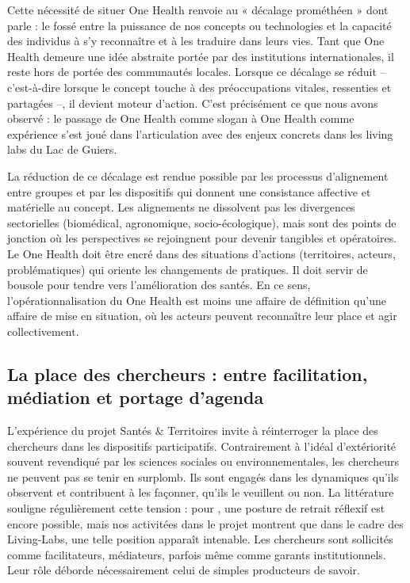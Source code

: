 \documentclass{article}
\begin{document}
Cette nécessité de situer One Health renvoie au « décalage prométhéen » dont parle \textcite{anders_obsolescence_1956} : le fossé entre la puissance de nos concepts ou technologies et la capacité des individus à s’y reconnaître et à les traduire dans leurs vies. Tant que One Health demeure une idée abstraite portée par des institutions internationales, il reste hors de portée des communautés locales. Lorsque ce décalage se réduit -- c’est-à-dire lorsque le concept touche à des préoccupations vitales, ressenties et partagées --, il devient moteur d’action. C’est précisément ce que nous avons observé : le passage de One Health comme slogan à One Health comme expérience s’est joué dans l’articulation avec des enjeux concrets dans les living labs du Lac de Guiers.

La réduction de ce décalage est rendue possible par les processus d’alignement entre groupes et par les dispositifs qui donnent une consistance affective et matérielle au concept. Les alignements ne dissolvent pas les divergences sectorielles (biomédical, agronomique, socio-écologique), mais sont des points de jonction où les perspectives se rejoingnent pour devenir tangibles et opératoires. Le One Health doit être encré dans des situations d'actions (territoires, acteurs, problématiques) qui oriente les changements de pratiques. Il doit servir de bousole pour tendre vers l'amélioration des santés. En ce sens, l’opérationnalisation du One Health est moins une affaire de définition qu’une affaire de mise en situation, où les acteurs peuvent reconnaître leur place et agir collectivement.

\subsection{La place des chercheurs : entre facilitation, médiation et portage d’agenda}

L’expérience du projet Santés \& Territoires invite à réinterroger la place des chercheurs dans les dispositifs participatifs. Contrairement à l’idéal d’extériorité souvent revendiqué par les sciences sociales ou environnementales, les chercheurs ne peuvent pas se tenir en surplomb. Ils sont engagés dans les dynamiques qu’ils observent et contribuent à les façonner, qu’ils le veuillent ou non. La littérature souligne régulièrement cette tension : pour \textcite{laslaz_jalons_2017}, une posture de retrait réflexif est encore possible, mais nos activitées dans le projet montrent que dans le cadre des Living-Labs, une telle position apparaît intenable. Les chercheurs sont sollicités comme facilitateurs, médiateurs, parfois même comme garants institutionnels. Leur rôle déborde nécessairement celui de simples producteurs de savoir.
\end{document}
